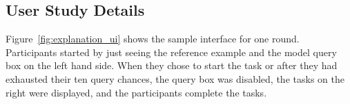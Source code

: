 \subsection{User Study Details}
\label{appendix:exp_user_study}

Figure~\ref{fig:explanation_ui} shows the sample interface for one round. 
Participants started by just seeing the reference example and the model query box on the left hand side.
When they chose to start the task or after they had exhausted their ten query chances, the query box was disabled, the tasks on the right were displayed, and the participants complete the tasks.